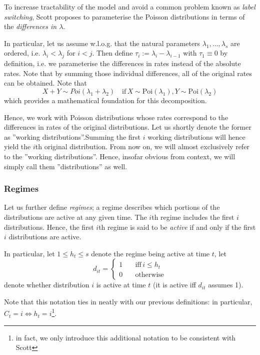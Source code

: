 		To increase tractability of the model and avoid a common problem known as \textit{label switching}, Scott proposes to parameterise the Poisson distributions in terms of the \textit{differences in $\lambda$}. 
		
		In particular, let us assume w.l.o.g. that the natural parameters $\lambda_1, \dots, \lambda_s$ are ordered, i.e. $\lambda_i < \lambda_j $ for $ i < j$. Then define $\tau_i := \lambda_i - \lambda_{i-1}$ with $\tau_1 \equiv 0$ by definition, i.e. we parameterise the differences in rates instead of the absolute rates.  Note that by summing those individual differences, all of the original rates can be obtained. Note that 
		\[
		X + Y \sim Poi(\lambda_1 + \lambda_2) \quad \text{if} \, X \sim \text{Poi}(\lambda_1), Y \sim \text{Poi}(\lambda_2)
		\]
		which provides a mathematical foundation for this decomposition. 
		
		Hence, we work with Poisson distributions whose rates correspond to the differences in rates of the original distributions. Let us shortly denote the former as ''working distributions''.Summing the first $i$ working distributions will hence yield the $i$th original distribution. 
		From now on, we will almost exclusively refer to the ''working distributions''. Hence, insofar obvious from context, we will simply call them ''distributions'' as well.
		
		\subsubsection*{Regimes}
		
			
			Let us further define \textit{regimes}; a regime describes which portions of the distributions are active at any given time. The $i$th regime includes the first $i$ distributions. Hence, the first $i$th regime is said to be \textit{active} if and only if the first $i$ distributions are active. 

			
			In particular, let $1 \leq h_t \leq s$  denote the regime being active at time $t$, let 
			\[
				d_{it} = \begin{cases}
					1 &\quad \text{iff} \, i \leq h_t\\
					0 &\quad \text{otherwise}
				\end{cases}
			\]
			denote whether distribution $i$ is active at time $t$ (it is active iff $d_{it}$ assumes 1).
			
			Note that this notation ties in neatly with our previous definitions: in particular, $C_t = i \iff h_t = i$\footnote{in fact, we only introduce this additional notation to be consistent with Scott}. 
			
